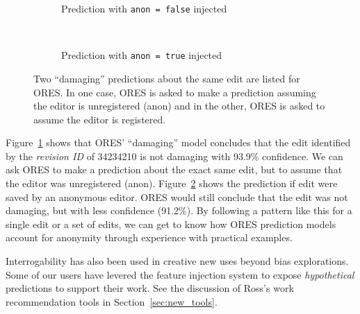 \begin{figure*}[h]
\centering
\begin{subfigure}[t]{.5\textwidth}
  \caption{Prediction with \texttt{anon = false} injected}
  \label{fig:anon_injection_false}
\end{subfigure}~~
\begin{subfigure}[t]{.5\textwidth}
  \caption{Prediction with \texttt{anon = true} injected}
  \label{fig:anon_injection_true}
\end{subfigure}
\caption{Two ``damaging'' predictions about the same edit are listed for ORES.  In one case, ORES is asked to make a prediction assuming the editor is unregistered (anon) and in the other, ORES is asked to assume the editor is registered.}
\label{fig:anon_injection}
\end{figure*}

Figure~\ref{fig:anon_injection_false} shows that ORES' ``damaging'' model concludes that the edit identified by the \emph{revision ID} of 34234210 is not damaging with 93.9\% confidence.  We can ask ORES to make a prediction about the exact same edit, but to assume that the editor was unregistered (anon). Figure~\ref{fig:anon_injection_true} shows the prediction if edit were saved by an anonymous editor.  ORES would still conclude that the edit was not damaging, but with less confidence (91.2\%).  By following a pattern like this for a single edit or a set of edits, we can get to know how ORES prediction models account for anonymity through experience with practical examples.

Interrogability has also been used in creative new uses beyond bias explorations.  Some of our users have levered the feature injection system to expose \emph{hypothetical} predictions to support their work.  See the discussion of Ross's work recommendation tools in Section~\ref{sec:new_tools}.
